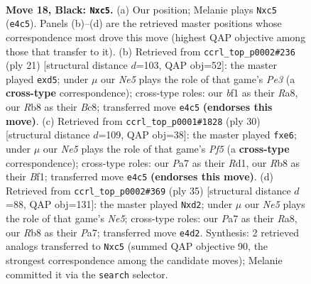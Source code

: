 \documentclass[11pt]{article}
\begin{document}
\clearpage

\begin{figure}[p]\centering
\begin{subfigure}{0.46\textwidth}\centering
\resizebox{\linewidth}{!}{%
\newchessgame
\chessboard[
  setfen={1rb2r2/p1ppqp2/2n1p2k/2P3pp/2Q1n3/2B2NP1/PP2PP1P/R3KB1R b - - 4 18},
  showmover=false,
  pgfstyle=straightmove, color=movearrow, markmove={e4-c5}
]}
\caption{}
\end{subfigure}\hfill
\begin{subfigure}{0.46\textwidth}\centering
\resizebox{\linewidth}{!}{%
\newchessgame
\chessboard[
  setfen={r1br2k1/ppp2pp1/2n1pq1p/3P4/Q2P4/P1P1PN2/5PPP/R3KB1R b KQ - 0 11},
  showmover=false,
  pgfstyle=straightmove, color=movearrow, markmove={e6-d5}
]}
\caption{}
\end{subfigure}
\\[4pt]
\begin{subfigure}{0.46\textwidth}\centering
\resizebox{\linewidth}{!}{%
\newchessgame
\chessboard[
  setfen={r1b1k2r/1pq2pp1/p2ppb2/4nP1p/3NP2P/2N5/PPPQ2P1/1K1R1B1R w kq - 3 16},
  showmover=false,
  pgfstyle=straightmove, color=movearrow, markmove={f5-e6}
]}
\caption{}
\end{subfigure}\hfill
\begin{subfigure}{0.46\textwidth}\centering
\resizebox{\linewidth}{!}{%
\newchessgame
\chessboard[
  setfen={r4rk1/ppp1pp2/3qb2p/3n2p1/4n2P/2P2NP1/P1QBPPB1/R3K2R b KQ - 2 18},
  showmover=false,
  pgfstyle=straightmove, color=movearrow, markmove={e4-d2}
]}
\caption{}
\end{subfigure}
\caption{\textbf{Move 18, Black: \texttt{Nxc5}.} (a) Our position; Melanie plays \texttt{Nxc5} (\texttt{e4c5}). Panels (b)--(d) are the retrieved master positions whose correspondence most drove this move (highest QAP objective among those that transfer to it). (b) Retrieved from \texttt{ccrl\_top\_p0002\#236} (ply 21) [structural distance $d$=103, QAP obj=52]: the master played \texttt{exd5}; under $\mu$ our \emph{Ne5} plays the role of that game's \emph{Pe3} (a \textbf{cross-type} correspondence); cross-type roles: our \emph{b}f1 as their \emph{R}a8, our \emph{R}b8 as their \emph{B}c8; transferred move \texttt{e4c5} \textbf{(endorses this move)}. (c) Retrieved from \texttt{ccrl\_top\_p0001\#1828} (ply 30) [structural distance $d$=109, QAP obj=38]: the master played \texttt{fxe6}; under $\mu$ our \emph{Ne5} plays the role of that game's \emph{Pf5} (a \textbf{cross-type} correspondence); cross-type roles: our \emph{P}a7 as their \emph{R}d1, our \emph{R}b8 as their \emph{B}f1; transferred move \texttt{e4c5} \textbf{(endorses this move)}. (d) Retrieved from \texttt{ccrl\_top\_p0002\#369} (ply 35) [structural distance $d$=88, QAP obj=131]: the master played \texttt{Nxd2}; under $\mu$ our \emph{Ne5} plays the role of that game's \emph{Ne5}; cross-type roles: our \emph{P}a7 as their \emph{R}a8, our \emph{R}b8 as their \emph{P}a7; transferred move \texttt{e4d2}. Synthesis: 2 retrieved analogs transferred to \texttt{Nxc5} (summed QAP objective 90, the strongest correspondence among the candidate moves); Melanie committed it via the \texttt{search} selector.}
\label{fig:thought-m35}
\end{figure}
\end{document}
